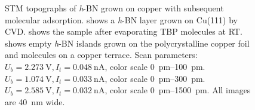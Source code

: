 \label{section:TBP-on-hBN}
\begin{figure}[] \centering
	\caption{STM topographs of \textit{h}-BN grown on copper with subsequent molecular adsorption.  shows a \textit{h}-BN layer grown on Cu(111) by CVD.  shows the sample after evaporating TBP molecules at RT.  shows empty \textit{h}-BN islands grown on the polycrystalline copper foil and molecules on a copper terrace. 
		Scan parameters:  $U_b=\SI{2.273}{\volt}, I_t=\SI{0.048}{\nano \ampere}$, color scale \SIrange{0}{100}{\pico \meter}.  $U_b=\SI{1.074}{\volt}, I_t=\SI{0.033}{\nano \ampere}$, color scale \SIrange{0}{300}{\pico \meter}.  $U_b=\SI{2.585}{\volt}, I_t=\SI{0.032}{\nano \ampere}$, color scale \SIrange{0}{1500}{\pico \meter}.  All images are \SI{40}{\nano \meter} wide.}
	\label{TBP-on-hBN}
\end{figure}

